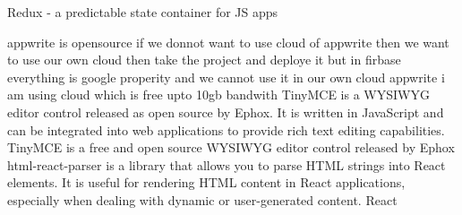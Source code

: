 Redux - a predictable state container for JS apps

appwrite is opensource if we donnot want to use cloud of appwrite then we want to use our own cloud then take the project and deploye it 
but in firbase everything is google properity and we cannot use it in our own cloud
appwrite i am using cloud which is free upto 10gb  bandwith
TinyMCE is a WYSIWYG editor control released as open source by Ephox. It is written in JavaScript and can be integrated into web applications to provide rich text editing capabilities.
TinyMCE is a free and open source WYSIWYG editor control released by Ephox
html-react-parser is a library that allows you to parse HTML strings into React elements. It is useful for rendering HTML content in React applications, especially when dealing with dynamic or user-generated content.
React
